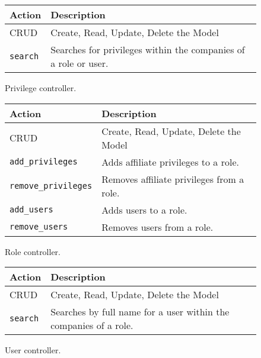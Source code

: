 \begin{figure}[htb]
\begin{center}
\begin{tabular}{ | l | p{8cm} | }
  \hline
    \textbf{Action} & \textbf{Description} \\ \hline
    CRUD & Create, Read, Update, Delete the Model \\ \hline
    \verb+search+ & Searches for privileges within the companies of a role or user.\\ \hline
\end{tabular}
\caption{Privilege controller.}
\label{tab:privilege_controller_actions}
\end{center}
\end{figure}

\begin{figure}[htb]
\begin{center}
\begin{tabular}{ | l | p{8cm} | }
  \hline
    \textbf{Action} & \textbf{Description} \\ \hline
    CRUD & Create, Read, Update, Delete the Model \\ \hline
    \verb+add_privileges+ & Adds affiliate privileges to a role.\\ \hline
    \verb+remove_privileges+ & Removes affiliate privileges from a role.\\ \hline
    \verb+add_users+ & Adds users to a role.\\ \hline
    \verb+remove_users+ & Removes users from a role.\\ \hline
\end{tabular}
\caption{Role controller.}
\label{tab:role_controller_actions}
\end{center}
\end{figure}

\begin{figure}[htb]
\begin{center}
\begin{tabular}{ | l | p{8cm} | }
  \hline
    \textbf{Action} & \textbf{Description} \\ \hline
    CRUD & Create, Read, Update, Delete the Model \\ \hline
    \verb+search+ & Searches by full name for a user within the companies of a role.\\ \hline
\end{tabular}
\caption{User controller.}
\label{tab:user_controller_actions}
\end{center}
\end{figure}